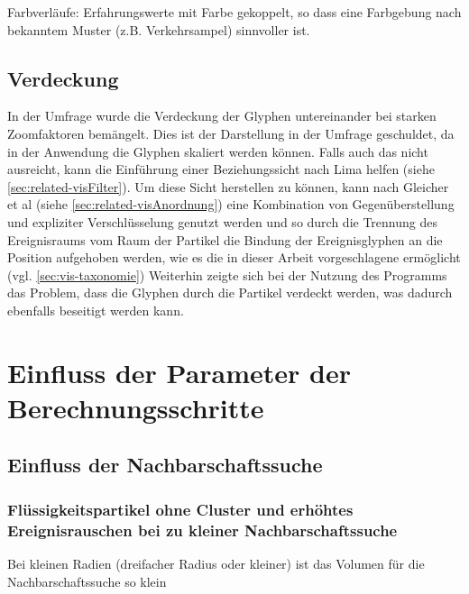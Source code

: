 
Farbverläufe:
Erfahrungswerte mit Farbe gekoppelt, so dass eine Farbgebung nach bekanntem Muster (z.B. Verkehrsampel) sinnvoller ist.

\subsection{Verdeckung}
In der Umfrage wurde die Verdeckung der Glyphen untereinander bei starken Zoomfaktoren bemängelt. Dies ist der Darstellung in der Umfrage geschuldet, da in der Anwendung die Glyphen skaliert werden können. Falls auch das nicht ausreicht, kann die Einführung einer Beziehungssicht nach Lima helfen (siehe \autoref{sec:related-visFilter}). Um diese Sicht herstellen zu können, kann nach Gleicher et al (siehe \autoref{sec:related-visAnordnung}) eine Kombination von Gegenüberstellung und expliziter Verschlüsselung genutzt werden und so durch die Trennung des Ereignisraums vom Raum der Partikel die Bindung der Ereignisglyphen an die Position aufgehoben werden, wie es die in dieser Arbeit vorgeschlagene  ermöglicht (vgl. \autoref{sec:vis-taxonomie})
Weiterhin zeigte sich bei der Nutzung des Programms das Problem, dass die Glyphen durch die Partikel verdeckt werden, was dadurch ebenfalls beseitigt werden kann. %

\section{Einfluss der Parameter der Berechnungsschritte}

\subsection{Einfluss der Nachbarschaftssuche}\label{sec:eva:nachbarschaftssuche}

\subsubsection{Flüssigkeitspartikel ohne Cluster und erhöhtes Ereignisrauschen bei zu kleiner Nachbarschaftssuche}

Bei kleinen Radien (dreifacher Radius oder kleiner) ist das Volumen für die Nachbarschaftssuche so klein %

